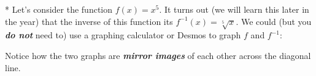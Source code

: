 \documentclass[fleqn,letterpaper,12pt,printwatermark=false]{memoir}
\begin{document}
\begin{myExampleForTikzGraphs}*{
    Let's consider the function 
    \( f(x) = x^5 \).
    It turns out (we will learn this later in the year)
    that the inverse of this function its
    \( f^{-1}(x) = \sqrt[5]{x} \).
}
    We could (but you {\bfseries\itshape do not} need to) use a graphing calculator or Desmos to graph $f$ and $f^{-1}$:

    \begin{center}
    \end{center}
    
    \noindent Notice how the two graphs are {\bfseries\itshape mirror images} of each other 
    across the diagonal line.
\end{myExampleForTikzGraphs}

  
\end{document}
